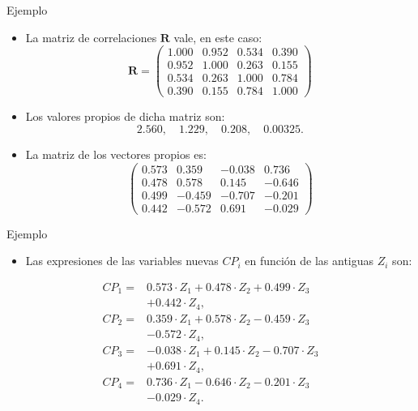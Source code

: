 \documentclass[
  spanish,
  ignorenonframetext,
]{beamer}
\providecommand{\tightlist}{%
  \setlength{\itemsep}{0pt}\setlength{\parskip}{0pt}}
\begin{document}
\begin{frame}{Ejemplo}
\protect\hypertarget{ejemplo-7}{}
\begin{itemize}
\tightlist
\item
  La matriz de correlaciones \(\mathbf{R}\) vale, en este caso: \[
  \mathbf{R} =
  \left(
  \begin{array}{rrrr}
  1.000 & 0.952 & 0.534 & 0.390 \\
  0.952 & 1.000 & 0.263 & 0.155 \\
  0.534 & 0.263 & 1.000 & 0.784 \\
  0.390 & 0.155 & 0.784 & 1.000 
  \end{array}
  \right)
  \]
\item
  Los valores propios de dicha matriz son: \[
  2.560,\quad 1.229,\quad 0.208,\quad 0.00325.
  \]
\item
  La matriz de los vectores propios es: \[
  \left(
  \begin{array}{rrrr}
  0.573 & 0.359 & -0.038 & 0.736 \\
  0.478 & 0.578 & 0.145 & -0.646 \\
  0.499 & -0.459 & -0.707 & -0.201 \\
  0.442 & -0.572 & 0.691 & -0.029 
  \end{array}
  \right)
  \]
\end{itemize}
\end{frame}

\begin{frame}{Ejemplo}
\protect\hypertarget{ejemplo-8}{}
\begin{itemize}
\tightlist
\item
  Las expresiones de las variables nuevas \(CP_i\) en función de las
  antiguas \(Z_i\) son:
\end{itemize}

\[
\begin{array}{rl}
CP_1 = & 0.573\cdot Z_1 +0.478\cdot Z_2 +0.499\cdot Z_3  \\ & +0.442 \cdot Z_4,
\\
CP_2 = & 0.359\cdot Z_1 + 0.578\cdot Z_2 -0.459 \cdot Z_3 \\ & -0.572 \cdot Z_4,
\\
CP_3 = & -0.038\cdot Z_1 +0.145 \cdot Z_2 -0.707\cdot Z_3 \\ &  +0.691\cdot Z_4,
\\
CP_4 = & 0.736 \cdot Z_1 - 0.646\cdot Z_2 - 0.201\cdot Z_3 \\ & - 0.029 \cdot
Z_4.
\end{array}
\]
\end{frame}
\end{document}
